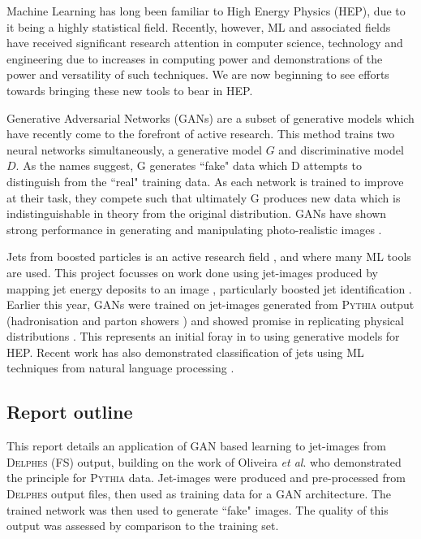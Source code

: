 \documentclass[twocolumn]{article}
\newcommand{\pkg}[1]{\textsc{#1}}
\begin{document}
Machine Learning has long been familiar to High Energy Physics (HEP), due to it being a highly statistical field. Recently, however, ML and associated fields have received significant research attention in computer science, technology and engineering due to increases in computing power and demonstrations of the power and versatility of such techniques. We are now beginning to see efforts towards bringing these new tools to bear in HEP.

Generative Adversarial Networks (GANs) \cite{gan1} are a subset of generative models which have recently come to the forefront of active research. This method trains two neural networks simultaneously, a generative model $G$ and discriminative model $D$. As the names suggest, G generates ``fake" data which D attempts to distinguish from the ``real" training data. As each network is trained to improve at their task, they compete such that ultimately G produces new data which is indistinguishable in theory from the original distribution. GANs have shown strong performance in generating and manipulating photo-realistic images \cite{Radford2015,odena2016conditional,learnww,text2im,GoodfellowNips}.

Jets from boosted particles is an active research field \cite{BOOST}, and where many ML tools are used.  This project focusses on work done using jet-images produced by mapping jet energy deposits to an image \cite{cogan2014jet,de2015jet}, particularly boosted jet identification \cite{Komiske:2016rsd,Almeida:2015jua,Baldi:2016fql}. Earlier this year, GANs were trained on jet-images generated from \pkg{Pythia} output (hadronisation and parton showers \cite{pythia}) and showed promise in replicating physical distributions \cite{de2017learning}. This represents an initial foray in to using generative models for HEP. Recent work has also demonstrated classification of jets using ML techniques from natural language processing \cite{louppe2017qcd}.

\subsection{Report outline}

This report details an application of GAN based learning to jet-images from \pkg{Delphes} (FS) output, building on the work of Oliveira \textit{et al}. \cite{de2017learning} who demonstrated the principle for \pkg{Pythia} data. Jet-images were produced and pre-processed from \pkg{Delphes} output files, then used as training data for a GAN architecture. The trained network was then used to generate ``fake" images. The quality of this output was assessed by comparison to the training set. 
\end{document}

